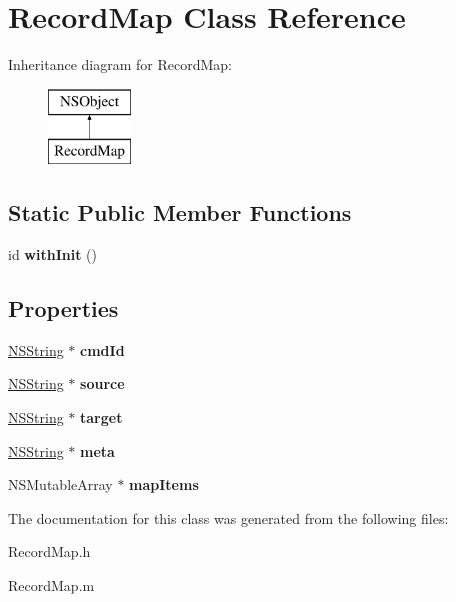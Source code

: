 \hypertarget{interface_record_map}{
\section{\-Record\-Map \-Class \-Reference}
\label{interface_record_map}
}
\-Inheritance diagram for \-Record\-Map\-:\begin{figure}[H]
\begin{center}
\leavevmode
\includegraphics[height=2.000000cm]{interface_record_map}
\end{center}
\end{figure}
\subsection*{\-Static \-Public \-Member \-Functions}
\begin{DoxyCompactItemize}
\item 
\hypertarget{interface_record_map_acdcfed3c6ac6522bb35f4c37bdc22c49}{
id {\bfseries with\-Init} ()}
\label{interface_record_map_acdcfed3c6ac6522bb35f4c37bdc22c49}

\end{DoxyCompactItemize}
\subsection*{\-Properties}
\begin{DoxyCompactItemize}
\item 
\hypertarget{interface_record_map_abf0c3203e8c28ecf7da0c83a450802be}{
\hyperlink{class_n_s_string}{\-N\-S\-String} $\ast$ {\bfseries cmd\-Id}}
\label{interface_record_map_abf0c3203e8c28ecf7da0c83a450802be}

\item 
\hypertarget{interface_record_map_adc1c74facf55d83e06bd887e2d54b5d9}{
\hyperlink{class_n_s_string}{\-N\-S\-String} $\ast$ {\bfseries source}}
\label{interface_record_map_adc1c74facf55d83e06bd887e2d54b5d9}

\item 
\hypertarget{interface_record_map_a723f2d30d0ef569ace1dde005036f577}{
\hyperlink{class_n_s_string}{\-N\-S\-String} $\ast$ {\bfseries target}}
\label{interface_record_map_a723f2d30d0ef569ace1dde005036f577}

\item 
\hypertarget{interface_record_map_adc8a627547989263dce8bf0bb05fd0a1}{
\hyperlink{class_n_s_string}{\-N\-S\-String} $\ast$ {\bfseries meta}}
\label{interface_record_map_adc8a627547989263dce8bf0bb05fd0a1}

\item 
\hypertarget{interface_record_map_a7aec30cb32e7c3e45035985af1cd5c1f}{
\-N\-S\-Mutable\-Array $\ast$ {\bfseries map\-Items}}
\label{interface_record_map_a7aec30cb32e7c3e45035985af1cd5c1f}

\end{DoxyCompactItemize}


\-The documentation for this class was generated from the following files\-:\begin{DoxyCompactItemize}
\item 
\-Record\-Map.\-h\item 
\-Record\-Map.\-m\end{DoxyCompactItemize}
